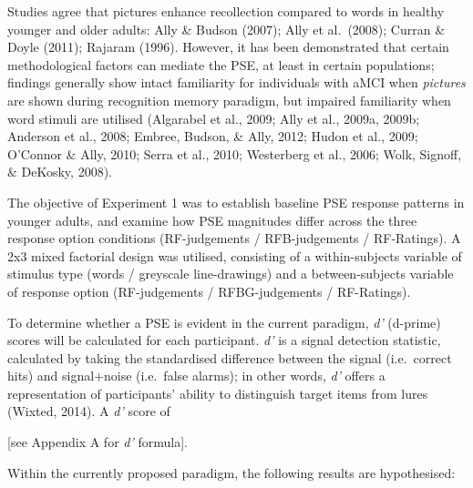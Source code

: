 \documentclass[
  11pt,
]{article}
\begin{document}
Studies agree that pictures enhance recollection compared to words in
healthy younger and older adults: Ally \& Budson (2007); Ally et
al.~(2008); Curran \& Doyle (2011); Rajaram (1996). However, it has been
demonstrated that certain methodological factors can mediate the PSE, at
least in certain populations; findings generally show intact familiarity
for individuals with aMCI when \emph{pictures} are shown during
recognition memory paradigm, but impaired familiarity when word stimuli
are utilised (Algarabel et al., 2009; Ally et al., 2009a, 2009b;
Anderson et al., 2008; Embree, Budson, \& Ally, 2012; Hudon et al.,
2009; O'Connor \& Ally, 2010; Serra et al., 2010; Westerberg et al.,
2006; Wolk, Signoff, \& DeKosky, 2008).

The objective of Experiment 1 was to establish baseline PSE response
patterns in younger adults, and examine how PSE magnitudes differ across
the three response option conditions (RF-judgements / RFB-judgements /
RF-Ratings). A 2x3 mixed factorial design was utilised, consisting of a
within-subjects variable of stimulus type (words / greyscale
line-drawings) and a between-subjects variable of response option
(RF-judgements / RFBG-judgements / RF-Ratings).

To determine whether a PSE is evident in the current paradigm, \emph{d'}
(d-prime) scores will be calculated for each participant. \emph{d'} is a
signal detection statistic, calculated by taking the standardised
difference between the signal (i.e.~correct hits) and signal+noise
(i.e.~false alarms); in other words, \emph{d'} offers a representation
of participants' ability to distinguish target items from lures (Wixted,
2014). A \emph{d'} score of

{[}see Appendix A for \emph{d'} formula{]}.

Within the currently proposed paradigm, the following results are
hypothesised:
\end{document}
